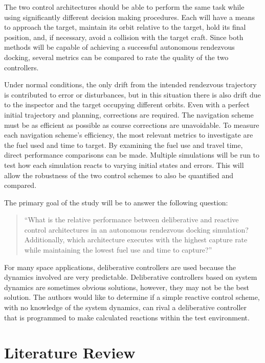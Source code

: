 \documentclass[journal, 10pt]{IEEEtran}
\begin{document}
The two control architectures should be able to perform the same task while using significantly different decision making procedures.  Each will have a means to approach the target, maintain its orbit relative to the target, hold its final position, and, if necessary, avoid a collision with the target craft.  Since both methods will be capable of achieving a successful autonomous rendezvous docking, several metrics can be compared to rate the quality of the two controllers.

Under normal conditions, the only drift from the intended rendezvous trajectory is contributed to error or disturbances, but in this situation there is also drift due to the inspector and the target occupying different orbits.  Even with a perfect initial trajectory and planning, corrections are required.  The navigation scheme must be as efficient as possible as course corrections are unavoidable. To measure each navigation scheme's efficiency, the most relevant metrics to investigate are the fuel used and time to target.  By examining the fuel use and travel time, direct performance comparisons can be made.  Multiple simulations will be run to test how each simulation reacts to varying initial states and errors.  This will allow the robustness of the two control schemes to also be quantified and compared.

The primary goal of the study will be to answer the following question:

\begin{quote}
``What is the relative performance between deliberative and reactive control architectures in an autonomous rendezvous docking simulation? Additionally, which architecture executes with the highest capture rate while maintaining the lowest fuel use and time to capture?''
\end{quote}

For many space applications, deliberative controllers are used because the dynamics involved are very predictable. Deliberative controllers based on system dynamics are sometimes obvious solutions, however, they may not be the best solution.  The authors would like to determine if a simple reactive control scheme, with no knowledge of the system dynamics, can rival a deliberative controller that is programmed to make calculated reactions within the test environment. 

\section{Literature Review}
\end{document}
